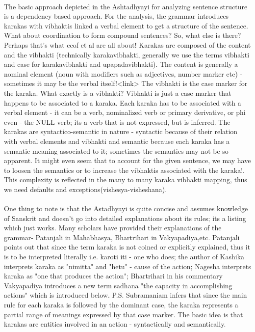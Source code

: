 \documentclass[a4paper,10pt]{article}
\begin{document}
\paragraph{} The basic approach depicted in the Ashtadhyayi for analyzing sentence structure is a dependency based approach. \color{blue!100}For the analysis, the grammar introduces karakas with vibhaktis linked a verbal element to get a structure of the sentence. \color{red!100}What about coordination to form compound sentences? So, what else is there? \color{green!100}Perhaps that's what ccof et al are all about! \color{black!100}Karakas are composed of the content and the vibhakti (technically karakavibhakti, generally we use the terms vibhakti and case for karakavibhakti and upapadavibhakti). \color{blue!100}The content is generally a nominal element (noun with modifiers such as adjectives, number marker etc) - \color{green!100}sometimes it may be the verbal itself!<link> \color{blue!100}The vibhakti is the case marker for the karaka. \color{red!100}What exactly is a vibhakti? \color{blue!100}Vibhakti is just a case marker that happens to be associated to a karaka. \color{black!100}Each karaka has to be associated with a verbal element - it can be a verb, \color{blue!100}nominalized verb or primary derivative, or phi even - the NULL verb; its a verb that is not expressed, but is inferred. \color{black!100}The karakas are syntactico-semantic in nature - \color{blue!100}syntactic because of their relation with verbal elements and vibhakti and semantic because each karaka has a semantic meaning associated to it; \color{red!100}sometimes the semantics may not be so apparent. It might even seem that to account for the given sentence, we may have to loosen the semantics or to increase the vibhaktis associated with the karaka!. \color{black!100}This complexity is reflected in the many to many karaka vibhakti mapping, thus we need defaults and exceptions(vishesya-visheshana).
\paragraph{} One thing to note is that the Astadhyayi is quite concise and assumes knowledge of Sanskrit and doesn't go into detailed explanations about its rules; its a listing which just works. Many scholars have provided their explanations of the grammar- Patanjali in Mahabhasya, Bhartrihari in Vakyapadiya,etc. Patanjali points out that since the term karaka is not coined or explicitly explained, thus it is to be interpreted literally i.e. karoti iti - one who does; the author of Kashika interprets karaka as "nimitta" and "hetu" - cause of the action; Nagesha interprets karaka as "one that produces the action"; Bhartrihari in his commentary Vakyapadiya introduces a new term sadhana "the capacity in accomplishing actions" which is introduced below. P.S. Subramaniam infers that since the main rule for each karaka is followed by the dominant case, the karaka represents a partial range of meanings expressed by that case marker. The basic idea is that karakas are entities involved in an action - syntactically and semantically.
\end{document}
